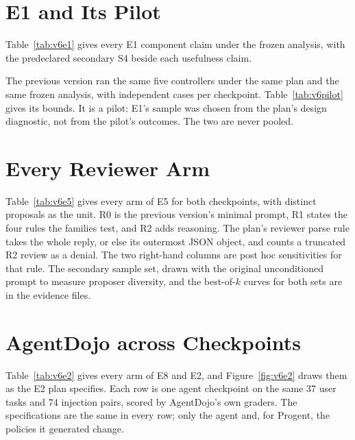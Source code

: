 \section{E1 and Its Pilot}\label{app:v6e1}

Table~\ref{tab:v6e1} gives every E1 component claim under the frozen analysis, with the predeclared secondary S4
beside each usefulness claim.



The previous version ran the same five controllers under the same plan and the same frozen analysis, with
\vsixPilotN{} independent cases per checkpoint. \vsixPilotSentence{} Table~\ref{tab:v6pilot} gives its bounds. It is a
pilot: E1's sample was chosen from the plan's design diagnostic, not from the pilot's outcomes. The two are never
pooled.



\section{Every Reviewer Arm}\label{app:v6e5}

Table~\ref{tab:v6e5} gives every arm of E5 for both checkpoints, with distinct proposals as the unit. R0 is the
previous version's minimal prompt, R1 states the four rules the families test, and R2 adds reasoning. The plan's reviewer parse rule takes the
whole reply, or else its outermost JSON object, and counts a truncated R2 review as a denial. The two right-hand
columns are post hoc sensitivities for that rule. The secondary sample set, drawn with the original unconditioned
prompt to measure proposer diversity, and the best-of-\(k\) curves for both sets are in the evidence files.



\section{AgentDojo across Checkpoints}\label{app:v6e2}

Table~\ref{tab:v6e2} gives every arm of E8 and E2, and Figure~\ref{fig:v6e2} draws them as the E2 plan specifies. Each row is one agent checkpoint on the same 37 user tasks and 74
injection pairs, scored by AgentDojo's own graders. The specifications are the same in every row; only the agent and,
for Progent, the policies it generated change.

